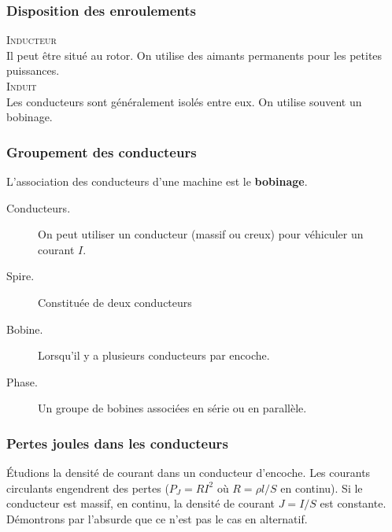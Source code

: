 		\subsubsection{Disposition des enroulements}
		\textsc{Inducteur}\\
		Il peut être situé au rotor. On utilise des aimants permanents pour les 
		petites puissances.\\
		
		\textsc{Induit}\\
		Les conducteurs sont généralement isolés entre eux. On utilise souvent 
		un bobinage.
		
		\subsubsection{Groupement des conducteurs}
		L'association des conducteurs d'une machine est le \textbf{bobinage}. 
		\begin{description}
		\item[Conducteurs.] On peut utiliser un conducteur (massif ou creux) pour 
		véhiculer un courant $I$.
		\item[Spire.] Constituée de deux conducteurs
		\item[Bobine.] Lorsqu'il y a plusieurs conducteurs par encoche.
		\item[Phase.] Un groupe de bobines associées en série ou en parallèle.
		\end{description}
		
	\subsubsection{Pertes joules dans les conducteurs}
	Étudions la densité de courant dans un conducteur d'encoche. Les courants 
	circulants engendrent des pertes ($P_J = RI^2$ où $R=\rho l/S$ en continu).
	Si le conducteur est massif, en continu, la densité de courant $J=I/S$ est 
	constante. Démontrons par l'absurde que ce n'est pas le cas en alternatif.\\
	
